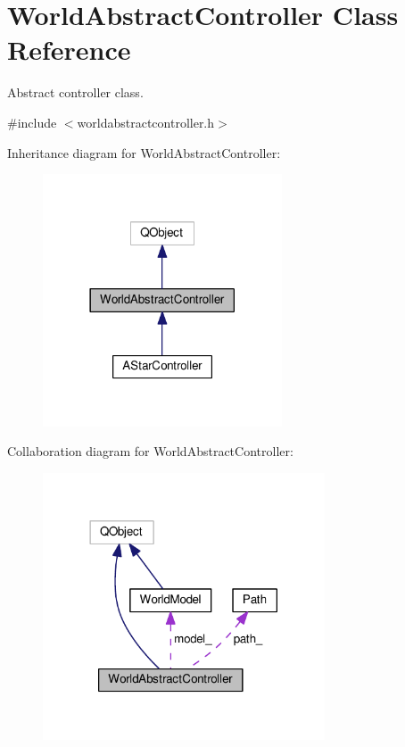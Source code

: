 \hypertarget{classWorldAbstractController}{}\section{World\+Abstract\+Controller Class Reference}
\label{classWorldAbstractController}


Abstract controller class.  




{\ttfamily \#include $<$worldabstractcontroller.\+h$>$}



Inheritance diagram for World\+Abstract\+Controller\+:
\nopagebreak
\begin{figure}[H]
\begin{center}
\leavevmode
\includegraphics[width=201pt]{d9/d94/classWorldAbstractController__inherit__graph}
\end{center}
\end{figure}


Collaboration diagram for World\+Abstract\+Controller\+:
\nopagebreak
\begin{figure}[H]
\begin{center}
\leavevmode
\includegraphics[width=237pt]{d1/d39/classWorldAbstractController__coll__graph}
\end{center}
\end{figure}
